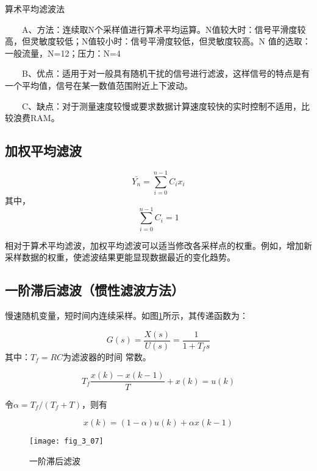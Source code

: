 \begin{remark}
  算术平均滤波法

　　A、方法：连续取N个采样值进行算术平均运算。N值较大时：信号平滑度较高，但灵敏度较低；N值较小时：信号平滑度较低，但灵敏度较高。N 值的选取：一般流量，N=12；压力：N=4

　　B、优点：适用于对一般具有随机干扰的信号进行滤波，这样信号的特点是有一个平均值，信号在某一数值范围附近上下波动。

　　C、缺点：对于测量速度较慢或要求数据计算速度较快的实时控制不适用，比较浪费RAM。
\end{remark}

\subsection{加权平均滤波}

\begin{equation}
\bar{Y_n} = \sum_{i=0}^{n-1}C_ix_i
\end{equation}
其中，
\begin{equation}
 \sum_{i=0}^{n-1}C_i =1
\end{equation}

\begin{remark}
  相对于算术平均滤波，加权平均滤波可以适当修改各采样点的权重。例如，增加新采样数据的权重，使滤波结果更能显现数据最近的变化趋势。
\end{remark}



\subsection{一阶滞后滤波（惯性滤波方法）}
慢速随机变量，短时间内连续采样。如图\ref{fig_3_07}所示，其传递函数为：

\begin{equation}
  G(s)=\frac{X(s)}{U(s)}=\frac{1}{1+T_fs}
\end{equation}
其中：$T_f=RC$为滤波器的时间 常数。

\begin{equation}
T_f\frac{x(k)-x(k-1)}{T}+x(k)=u(k)
\end{equation}

令$\alpha = T_f/(T_f+T)$，则有

\begin{equation}
x(k)=(1-\alpha)u(k)+\alpha x(k-1)
\end{equation}




\begin{figure}
  \centering
  \texttt{[image: fig\_3\_07]}\\
  \caption{一阶滞后滤波}\label{fig_3_07}
\end{figure}


